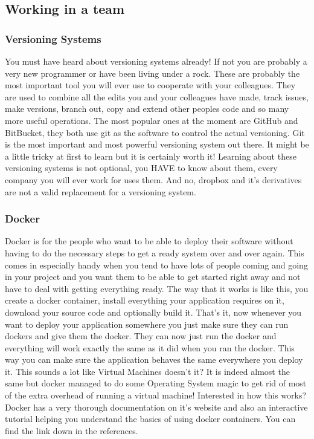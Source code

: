 \documentclass[paper=a4, fontsize=10pt]{scrartcl} %
\numberwithin{equation}{section} %
\numberwithin{figure}{section} %
\numberwithin{table}{section} %
\begin{document}
\subsection{Working in a team}

\subsubsection{Versioning Systems\cite{github}\cite{bitbucket}}
You must have heard about versioning systems already! If not you are probably a
very new programmer or have been living under a rock. These are probably the
most important tool you will ever use to cooperate with your colleagues. They
are used to combine all the edits you and your colleagues have made, track
issues, make versions, branch out, copy and extend other peoples code and so
many more useful operations. The most popular ones at the moment are GitHub\cite{github} and
BitBucket\cite{bitbucket}, they
both use git as the software to control the actual versioning. Git\cite{git} is the most
important and most powerful versioning system out there. It might be a little
tricky at first to learn but it is certainly worth it! Learning about these
versioning systems is not optional, you HAVE to know about them, every company
you will ever work for uses them. And no, dropbox and it's derivatives are not a
valid replacement for a versioning system.

\subsubsection{Docker\cite{docker}}
Docker is for the people who want to be able to deploy their software
without having to do the necessary steps to get a ready system over and over
again. This comes in especially handy when you tend to have lots of people
coming and going in your project and you want them to be able to get started
right away and not have to deal with getting everything ready. The way that it
works is like this, you create a docker container, install everything your
application requires on it, download your source code and optionally build it.
That's it, now whenever you want to deploy your application somewhere you just
make sure they can run dockers and give them the docker. They can now just run
the docker and everything will work exactly the same as it did when you ran the
docker. This way you can make sure the application behaves the same everywhere
you deploy it. This sounds a lot like Virtual Machines doesn't it? It is indeed
almost the same but docker managed to do some Operating System magic to get rid
of most of the extra overhead of running a virtual machine! Interested in how
this works? Docker has a very thorough documentation on it's website and also
an interactive tutorial helping you understand the basics of using docker
containers. You can find the link down in the references. 
\end{document}
